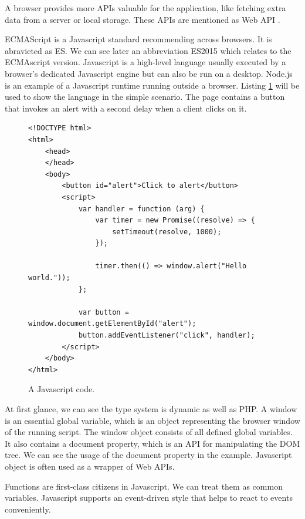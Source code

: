A browser provides more APIs valuable for the application, like fetching extra data from a server or local storage.
These APIs are mentioned as Web API .
\par
ECMAScript is a Javascript standard recommending across browsers.
It is abravieted as ES.
We can see later an abbreviation ES2015 which relates to the ECMAscript version.
Javascript is a high-level language usually executed by a browser's dedicated Javascript engine but can also be run on a desktop.
Node.js is an example of a Javascript runtime running outside a browser.
Listing \ref{img02:javascript} will be used to show the language in the simple scenario.
The page contains a button that invokes an alert with a second delay when a client clicks on it.
\par
\begin{figure}[H]
\begin{lstlisting}
<!DOCTYPE html>
<html>
    <head>
    </head>
    <body>
        <button id="alert">Click to alert</button>
        <script>
            var handler = function (arg) {
                var timer = new Promise((resolve) => {
                    setTimeout(resolve, 1000);
                }); 
        
                timer.then(() => window.alert("Hello world."));
            };  

            var button = window.document.getElementById("alert");
            button.addEventListener("click", handler);
        </script>
    </body>
</html>
\end{lstlisting}
\caption{A Javascript code.}
\label{img02:javascript}
\end{figure}
\par
{}
At first glance, we can see the type system is dynamic as well as PHP.
A window is an essential global variable, which is an object representing the browser window of the running script.
The window object consists of all defined global variables.
It also contains a document property, which is an API for manipulating the DOM tree.
We can see the usage of the document property in the example.
Javascript object is often used as a wrapper of Web APIs.
\par
Functions are first-class citizens in Javascript.
We can treat them as common variables.
Javascript supports an event-driven style that helps to react to events conveniently.
